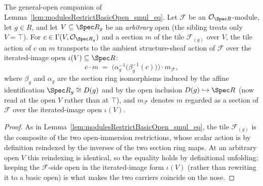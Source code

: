 \begin{lemma}

  \label{lem:modulesRestrictBasicOpen_smul_eq_genV}
  The general-open companion of Lemma~\ref{lem:modulesRestrictBasicOpen_smul_eq}. Let \(\mathcal{F}\)
  be an \(\mathcal{O}_{\Spec R}\)-module, let \(g \in R\), and let \(V \subseteq \Spec R_g\) be an
  \emph{arbitrary} open (the sibling treats only \(V = \top\)). For \(c \in \Gamma(V,
  \mathcal{O}_{\Spec R_g})\) and a section \(m\) of the tile \(\mathcal{F}_{(g)}\) over \(V\), the tile
  action of \(c\) on \(m\) transports to the ambient structure-sheaf action of \(\mathcal{F}\) over the
  iterated-image open \(\iota(V) \subseteq \Spec R\):
  \[
    c \cdot m \;=\; \bigl(\alpha_g^{-1}\bigl(\beta_g^{-1}(c)\bigr)\bigr) \cdot m_{\mathcal{F}},
  \]
  where \(\beta_g\) and \(\alpha_g\) are the section ring isomorphisms induced by the affine
  identification \(\Spec R_g \cong D(g)\) and by the open inclusion \(D(g) \hookrightarrow \Spec R\)
  (now read at the open \(V\) rather than at \(\top\)), and \(m_{\mathcal{F}}\) denotes \(m\) regarded
  as a section of \(\mathcal{F}\) over the iterated-image open \(\iota(V)\).
\end{lemma}
\begin{proof}
  \leanok
  As in Lemma~\ref{lem:modulesRestrictBasicOpen_smul_eq}, the tile \(\mathcal{F}_{(g)}\) is the
  composite of the two open-immersion restrictions, whose scalar action is by definition reindexed by
  the inverses of the two section ring maps. At an arbitrary open \(V\) this reindexing is identical, so
  the equality holds by definitional unfolding; keeping the \(\mathcal{F}\)-side open in the
  iterated-image form \(\iota(V)\) (rather than rewriting it to a basic open) is what makes the two
  carriers coincide on the nose.
\end{proof}

